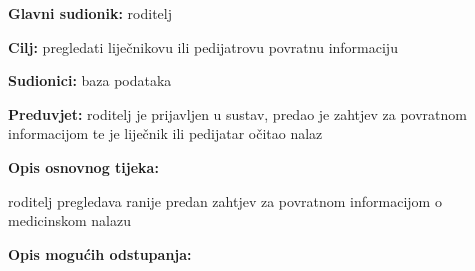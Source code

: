                     \noindent {}
					\begin{packed_item}
	
						\item \textbf{Glavni sudionik: }roditelj
						\item  \textbf{Cilj:} pregledati liječnikovu ili pedijatrovu povratnu informaciju 
						\item  \textbf{Sudionici:} baza podataka
						\item  \textbf{Preduvjet:} roditelj je prijavljen u sustav, predao je zahtjev za povratnom informacijom te je liječnik ili pedijatar očitao nalaz
						\item  \textbf{Opis osnovnog tijeka:}
						
						\item[] \begin{packed_enum}
	
							\item roditelj pregledava ranije predan zahtjev za povratnom informacijom o medicinskom nalazu
							\item 
							\item 

						\end{packed_enum}
						
						\item  \textbf{Opis mogućih odstupanja:}
						
						\item[] \begin{packed_item}
	
							\item[2.a] 
							\item[] \begin{packed_enum}
								
								\item 
								\item 
							\end{packed_enum}
							
						\end{packed_item}
					\end{packed_item}

